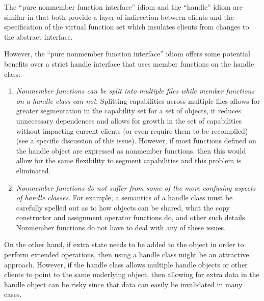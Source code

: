 \documentclass[pdf,ps2pdf,11pt]{SANDreport}
\begin{document}
The ``pure nonmember function interface'' idiom and the ``handle'' idiom are
similar in that both provide a layer of indirection between clients and the
specification of the virtual function set which insulates clients from changes
to the abstract interface.

However, the ``pure nonmember function interface'' idiom offers some potential
benefits over a strict handle interface that uses member functions on the
handle class:

\begin{enumerate}

{}\item{}\textit{Nonmember functions can be split into multiple files while
member functions on a handle class can not}: Splitting capabilities across
multiple files allows for greater segmentation in the capability set for a set
of objects, it reduces unnecessary dependences and allows for growth in the
set of capabilities without impacting current clients (or even require them to
be recompiled) (see {}\cite[Item 23]{EffectiveC++3rd} a specific discussion of
this issue).  However, if most functions defined on the handle object are
expressed as nonmember functions, then this would allow for the same
flexibility to segment capabilities and this problem is eliminated.

{}\item{}\textit{Nonmember functions do not suffer from some of the more
confusing aspects of handle classes}.  For example, a semantics of a handle
class must be carefully spelled out as to how objects can be shared, what the
copy constructor and assignment operator functions do, and other such details.
Nonmember functions do not have to deal with any of these issues.

\end{enumerate}

On the other hand, if extra state needs to be added to the object in order to
perform extended operations, then using a handle class might be an attractive
approach.  However, if the handle class allows multiple handle objects or
other clients to point to the same underlying object, then allowing for extra
data in the handle object can be risky since that data can easily be
invalidated in many cases.
\end{document}
